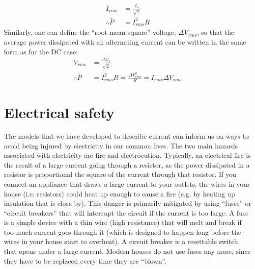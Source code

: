 \begin{align*}
I_{rms}&=\frac{I_0}{\sqrt 2}\\
\therefore\bar P&=I_{rms}^2R
\end{align*}
Similarly, one can define the ``root mean square'' voltage, $\Delta V_{rms}$, so that the average power dissipated with an alternating current can be written in the same form as for the DC case:
\begin{align*}
V_{rms}&=\frac{\Delta V_0}{\sqrt 2}\\
\therefore\bar P&=I_{rms}^2R =\frac{\Delta V_{rms}^2}{R}=I_{rms}\Delta V_{rms}
\end{align*}

\section{Electrical safety}
The models that we have developed to describe current can inform us on ways to avoid being injured by electricity in our common lives. The two main hazards associated with electricity are fire and electrocution. Typically, an electrical fire is the result of a large current going through a resistor, as the power dissipated in a resistor is proportional the square of the current through that resistor. If you connect an appliance that draws a large current to your outlets, the wires in your house (i.e. resistors) could heat up enough to cause a fire (e.g. by heating up insulation that is close by). This danger is primarily mitigated by using ``fuses'' or ``circuit breakers'' that will interrupt the circuit if the current is too large. A fuse is a simple device with a thin wire (high resistance) that will melt and break if too much current goes through it (which is designed to happen long before the wires in your house start to overheat). A circuit breaker is a resettable switch that opens under a large current. Modern houses do not use fuses any more, since they have to be replaced every time they are ``blown''.

